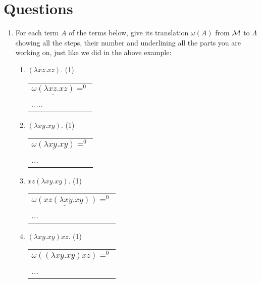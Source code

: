 \documentclass[11pt]{article}
\begin{document}
\section*{Questions}
\begin{enumerate}
  \item
 For each term $A$ of the terms below, give its translation $\omega(A)$ from ${\cal M}$ to $\Lambda$ showing all the steps, their number and underlining all the parts you are working on, just like we did in the above example: 
\begin{enumerate}
\item
$(\lambda xz.xz)$.
   \hfill{(1)} %
    \color{red}
    \begin{center}
\begin{tabular}{l}
$\underline{\omega(\lambda xz.xz)}=^0$\\
.....\\
\end{tabular}
\end{center}
   \color{black}
   \item
$(\lambda xy.xy)$.
   \hfill{(1)} %
   \color{red}
   \begin{center}
\begin{tabular}{l}
$\underline{\omega(\lambda xy.xy)}=^0$\\
...\\
\end{tabular}
\end{center}
\color{black}
\item
$xz(\lambda xy.xy)$.
   \hfill{(1)} %
   \color{red}
   \begin{center}
\begin{tabular}{l}
$\underline{\omega(xz(\lambda xy.xy))}=^0$\\
...\\
\end{tabular}
\end{center}
\color{black}
    \item
$(\lambda xy.xy)xz$.
   \hfill{(1)} %
     \color{red}
   \begin{center}
\begin{tabular}{l}
$\underline{\omega((\lambda xy.xy)xz)}=^0$\\
...\\
\end{tabular}
\end{center}
\color{black}
 

\end{enumerate}
\end{enumerate}
\end{document}
